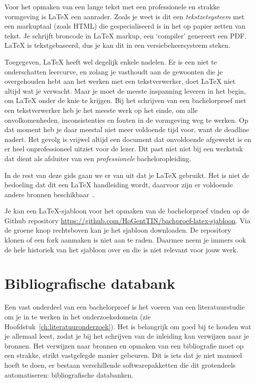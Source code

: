 Voor het opmaken van een lange tekst met een professionele en strakke vormgeving is {\LaTeX} een aanrader. Zoals je weet is dit een \emph{tekstzetsysteem} met een markuptaal (zoals HTML) die gespecialiseerd is in het op papier zetten van tekst. Je schrijft broncode in {\LaTeX} markup, een `compiler' genereert een PDF. {\LaTeX} is tekstgebaseerd, dus je kan dit in een versiebeheersysteem steken.

Toegegeven, {\LaTeX} heeft wel degelijk enkele nadelen. Er is een niet te onderschatten leercurve, en zolang je vasthoudt aan de gewoonten die je overgehouden hebt aan het werken met een tekstverwerker, doet {\LaTeX} niet altijd wat je verwacht. Maar je moet de meeste inspanning leveren in het begin, om {\LaTeX} onder de knie te krijgen. Bij het schrijven van een bachelorproef met een tekstverwerker heb je het meeste werk op het einde, om alle onvolkomenheden, inconsistenties en fouten in de vormgeving weg te werken. Op dat moment heb je daar meestal niet meer voldoende tijd voor, want de deadline nadert. Het gevolg is vrijwel altijd een document dat onvoldoende afgewerkt is en er heel onprofessioneel uitziet voor de lezer. Dit past niet niet bij een werkstuk dat dient als afsluiter van een \textit{professionele} bacheloropleiding.

In de rest van deze gids gaan we er van uit dat je {\LaTeX} gebruikt. Het is niet de bedoeling dat dit een {\LaTeX} handleiding wordt, daarvoor zijn er voldoende andere bronnen beschikbaar~\parencite{Oetiker2015}.

Je kan een {\LaTeX}-sjabloon voor het opmaken van de bachelorproef vinden op de Github repository \url{https://github.com/HoGentTIN/bachproef-latex-sjabloon}. Via de groene knop rechtsboven kan je het sjabloon downloaden. De repository klonen of een fork aanmaken is niet aan te raden. Daarmee neem je immers ook de hele historiek van het sjabloon over en die is niet relevant voor jouw werk.


\section{Bibliografische databank}
\label{sec:bibliografische-databank}

Een vast onderdeel van een bachelorproef is het voeren van een literatuurstudie om je in te werken in het onderzoeksdomein (zie Hoofdstuk~\ref{ch:literatuuronderzoek}). Het is belangrijk om goed bij te houden wat je allemaal leest, zodat je bij het schrijven van de inleiding kan verwijzen naar je bronnen. Het verwijzen naar bronnen en opmaken van een bibliografie moet op een strakke, strikt vastgelegde manier gebeuren. Dit is iets dat je niet manueel hoeft te doen, er bestaan verschillende softwarepakketten die dit grotendeels automatiseren: bibliografische databanken.

